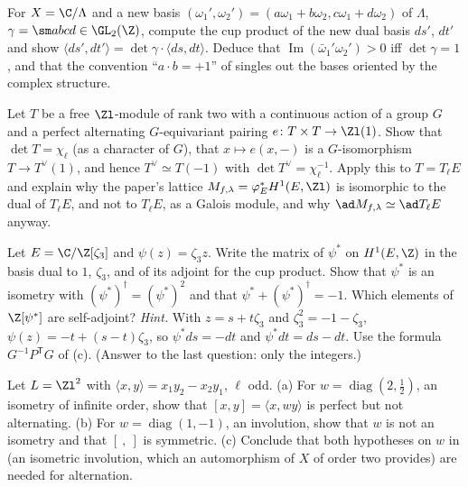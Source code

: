 \begin{exercise}\label{ex:curves:ex-basis-change}
For $X=\C/\Lambda$ and a new basis $(\omega_1',\omega_2')=(a\omega_1+b\omega_2,c\omega_1+d\omega_2)$ of $\Lambda$, $\gamma=\sm abcd\in\GL_2(\Z)$, compute the cup product of the new dual basis
$ds'$, $dt'$ and show $\langle ds',dt'\rangle=\det\gamma\cdot\langle ds,dt\rangle$. Deduce that $\operatorname{Im}(\bar\omega_1'\omega_2')>0$ iff $\det\gamma=1$, and that the convention ``$a\cdot b=+1$'' of
 singles out the bases oriented by the complex structure.
\end{exercise}

\begin{exercise}\label{ex:curves:ex-weil}
Let $T$ be a free $\Zl$-module of rank two with a continuous action of a group $G$ and a perfect alternating $G$-equivariant pairing $e\colon T\times T\to\Zl(1)$. Show that $\det T=\chi_\ell$ (as a
character of $G$), that $x\mapsto e(x,-)$ is a $G$-isomorphism $T\to T^\vee(1)$, and hence $T^\vee\simeq T(-1)$ with $\det T^\vee=\chi_\ell^{-1}$. Apply this to $T=T_\ell E$ and explain why the
paper's lattice $M_{f,\lambda}=\varphi_E^*H^1(E,\Zl)$ is isomorphic to the dual of $T_\ell E$, and not to $T_\ell E$, as a Galois module, and why $\ad M_{f,\lambda}\simeq\ad T_\ell E$ anyway.
\end{exercise}

\begin{exercise}\label{ex:curves:ex-zeta3}
Let $E=\C/\Z[\zeta_3]$ and $\psi(z)=\zeta_3z$. Write the matrix of $\psi^*$ on $H^1(E,\Z)$ in the basis dual to $1$, $\zeta_3$, and of its adjoint for the cup product. Show that $\psi^*$ is an
isometry with $(\psi^*)^\dagger=(\psi^*)^2$ and that $\psi^*+(\psi^*)^\dagger=-1$. Which elements of $\Z[\psi^*]$ are self-adjoint?
\emph{Hint.} With $z=s+t\zeta_3$ and $\zeta_3^2=-1-\zeta_3$, $\psi(z)=-t+(s-t)\zeta_3$, so $\psi^*ds=-dt$ and $\psi^*dt=ds-dt$. Use the formula $G^{-1}P^{\mathsf T}G$ of
(c). (Answer to the last question: only the integers.)
\end{exercise}

\begin{exercise}\label{ex:curves:ex-twist-counter}
Let $L=\Zl^2$ with $\langle x,y\rangle=x_1y_2-x_2y_1$, $\ell$ odd. (a) For $w=\operatorname{diag}(2,\frac12)$, an isometry of infinite order, show that $[x,y]=\langle x,wy\rangle$ is perfect but not alternating. (b) For
$w=\operatorname{diag}(1,-1)$, an involution, show that $w$ is not an isometry and that $[\ ,\ ]$ is symmetric. (c) Conclude that both hypotheses on $w$ in 
(an isometric involution, which an automorphism of $X$ of order two provides) are needed for alternation.
\end{exercise}

